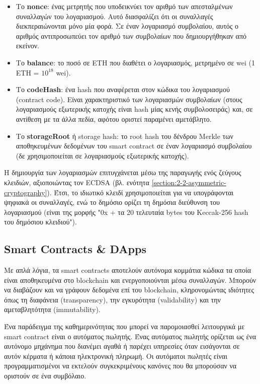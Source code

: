 \begin{itemize}
	\item Το \textbf{nonce}: ένας μετρητής που υποδεικνύει τον αριθμό των απεσταλμένων συναλλαγών του λογαριασμού. Αυτό διασφαλίζει ότι οι συναλλαγές διεκπεραιώνονται μόνο μία φορά. Σε έναν λογαριασμό συμβολαίου, αυτός ο αριθμός αντιπροσωπεύει τον αριθμό των συμβολαίων που δημιουργήθηκαν από εκείνον.

	\item Το \textbf{balance}: το ποσό σε ETH που διαθέτει ο λογαριασμός, μετρημένο σε wei (1 ETH = $10^{18}$ wei).

	\item Το \textbf{codeHash}: ένα hash που αναφέρεται στον κώδικα του λογαριασμού (contract code). Είναι χαρακτηριστικό των λογαριασμών συμβολαίων (στους λογαριασμούς εξωτερικής κατοχής είναι hash μίας κενής συμβολοσειράς) και, σε αντίθεση με τα άλλα πεδία, αφότου οριστεί παραμένει αμετάβλητο.

	\item Το \textbf{storageRoot} ή storage hash: το root hash του δένδρου Merkle των αποθηκευμένων δεδομένων του smart contract σε έναν λογαριασμό συμβολαίου (δε χρησιμοποιείται σε λογαριασμούς εξωτερικής κατοχής).
\end{itemize}

Η δημιουργία των λογαριασμών επιτυγχάνεται μέσω της παραγωγής ενός ζεύγους κλειδιών, αξιοποιώντας τον 
ECDSA (βλ. ενότητα \ref{section:2-2-asymmetric-cryptography}). Έτσι, το ιδιωτικό κλειδί χρησιμοποιείται για να υπογράφονται ψηφιακά οι συναλλαγές, ενώ το δημόσιο ορίζει τη δημόσια διεύθυνση του λογαριασμού (είναι της μορφής "0x + τα 20 τελευταία bytes του Keccak-256 hash του δημόσιου κλειδιού").

\subsection{Smart Contracts \& DApps}
Με απλά λόγια, τα smart contracts αποτελούν αυτόνομα κομμάτια κώδικα τα οποία είναι αποθηκευμένα στο blockchain και ενεργοποιούνται μέσω συναλλαγών. Μπορούν να διαβάζουν και να γράφουν δεδομένα επί του blockchain, κληρονομώντας ιδιότητες όπως τη διαφάνεια (transparency), την εγκυρότητα (validability) και την αμεταβλητότητα (immutability).

Ένα παράδειγμα της καθημερινότητας που μπορεί να παρομοιασθεί λειτουργικά με smart contract είναι ο αυτόματος πωλητής\cite{2.6-ethereum-smart-contracts}. Ένας αυτόματος πωλητής ορίζεται ως ένα αυτόνομο μηχάνημα που διανέμει αγαθά ή παρέχει υπηρεσίες όταν εισάγονται σε αυτόν κέρματα ή κάποια ηλεκτρονική πληρωμή. Οι αυτόματοι πωλητές είναι προγραμματισμένοι να εκτελούν συγκεκριμένους κανόνες που θα μπορούσαν να οριστούν σε ένα συμβόλαιο.

